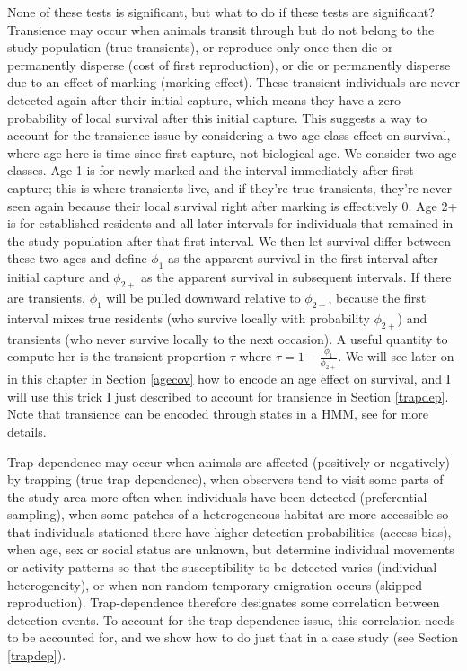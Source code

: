 \documentclass[
  12pt,
]{krantz}
\begin{document}
None of these tests is significant, but what to do if these tests are significant? Transience may occur when animals transit through but do not belong to the study population (true transients), or reproduce only once then die or permanently disperse (cost of first reproduction), or die or permanently disperse due to an effect of marking (marking effect). These transient individuals are never detected again after their initial capture, which means they have a zero probability of local survival after this initial capture. This suggests a way to account for the transience issue by considering a two-age class effect on survival, where age here is time since first capture, not biological age. We consider two age classes. Age 1 is for newly marked and the interval immediately after first capture; this is where transients live, and if they're true transients, they're never seen again because their local survival right after marking is effectively 0. Age 2+ is for established residents and all later intervals for individuals that remained in the study population after that first interval. We then let survival differ between these two ages and define \(\phi_1\) as the apparent survival in the first interval after initial capture and \(\phi_{2+}\) as the apparent survival in subsequent intervals. If there are transients, \(\phi_1\) will be pulled downward relative to \(\phi_{2+}\), because the first interval mixes true residents (who survive locally with probability \(\phi_{2+}\)) and transients (who never survive locally to the next occasion). A useful quantity to compute her is the transient proportion \(\tau\) where \(\displaystyle \tau = 1 - \frac{\phi_{1}}{\phi_{2+}}\). We will see later on in this chapter in Section \ref{agecov} how to encode an age effect on survival, and I will use this trick I just described to account for transience in Section \ref{trapdep}. Note that transience can be encoded through states in a HMM, see \citet{genovart2019} for more details.

Trap-dependence may occur when animals are affected (positively or negatively) by trapping (true trap-dependence), when observers tend to visit some parts of the study area more often when individuals have been detected (preferential sampling), when some patches of a heterogeneous habitat are more accessible so that individuals stationed there have higher detection probabilities (access bias), when age, sex or social status are unknown, but determine individual movements or activity patterns so that the susceptibility to be detected varies (individual heterogeneity), or when non random temporary emigration occurs (skipped reproduction). Trap-dependence therefore designates some correlation between detection events. To account for the trap-dependence issue, this correlation needs to be accounted for, and we show how to do just that in a case study (see Section \ref{trapdep}).
\end{document}
